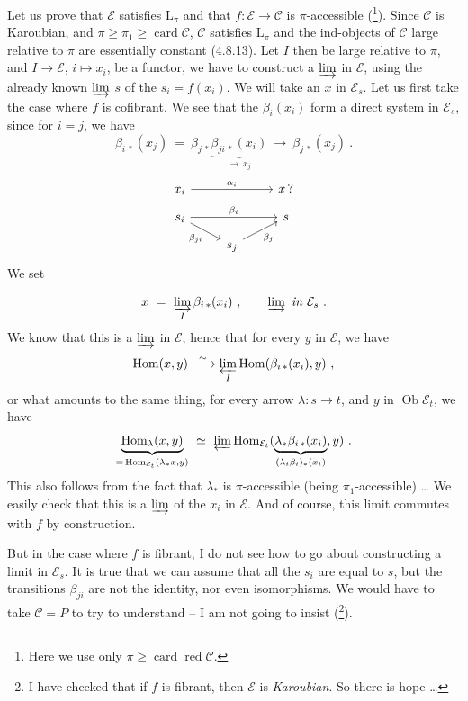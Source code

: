 \documentclass[11pt]{article}
\newcommand{\printedpage}[1]{\marginpar{\footnotesize p.~#1}}
\newcommand{\msp}[1]{\marginpar{\footnotesize [#1]}}
\newcommand{\cE}{\mathcal{E}}
\newcommand{\cC}{\mathcal{C}}
\newcommand{\Ob}{\operatorname{Ob}}
\newcommand{\Hom}{\operatorname{Hom}}
\newcommand{\card}{\operatorname{card}}
\newcommand{\red}{\operatorname{\text{red}}}
\begin{document}
Let us prove that $\cE$ satisfies $\mathrm{L}_{\pi}$ and that $f : \cE \longrightarrow \cC$ is $\pi$-accessible (\footnote[182]{Here we use only $\pi \geqslant \card \red \cC$.}). Since $\cC$ is Karoubian, and $\pi \geqslant \pi_1 \geqslant \card \cC$, $\cC$ satisfies $\mathrm{L}_{\pi}$ and the ind-objects of $\cC$ large relative to $\pi$ are essentially constant (4.8.13). Let $I$ then be large relative to $\pi$, and $I \longrightarrow \cE$, $i \longmapsto x_i$, be a functor, we have to construct a $\varinjlim$ in $\cE$, using the already known $\varinjlim$ $s$ of the $s_i = f(x_i)$. We will take an $x$ in $\cE_s$. Let us first take the case where $f$ is cofibrant. We see that the $\beta_i(x_i)$ form a direct system in $\cE_s$, since for $i = j$, we have
\[
\beta_{i\,*}(x_j) \ = \ \beta_{j\,*} \underbrace{\beta_{ji\,*}(x_i)}_{\longrightarrow \, x_j} \ \longrightarrow \ \beta_{j\,*}(x_j) \ . %
\]
\[
\begin{tikzcd}[row sep=small]
x_i \arrow[rr, "\alpha_i"] & & x \, ? \\
s_i \arrow[rr, "\beta_i"] \arrow[dr, "\beta_{ji}"'] & & s \\
& s_j \arrow[ur, "\beta_j"'] &
\end{tikzcd}
\]
We set

\printedpage{168}
\msp{page 438}
\[
x \ = \ \varinjlim_{I} \beta_{i\,*}(x_i) \ , \qquad \varinjlim \ \textit{in } \cE_s \ .
\]
We know that this is a $\varinjlim$ in $\cE$, hence that for every $y$ in $\cE$, we have
\[
\Hom(x, y) \xrightarrow{\ \sim\ } \varprojlim_{I} \Hom(\beta_{i\,*}(x_i), y) \ ,
\]
or what amounts to the same thing, for every arrow $\lambda : s \longrightarrow t$, and $y$ in $\Ob \cE_t$, we have
\[
\underbrace{\Hom_{\lambda}(x, y)}_{= \, \Hom_{\cE_t}(\lambda_* x, y)} \ \simeq \ \varprojlim \Hom_{\cE_t}(\underbrace{\lambda_* \beta_{i\,*}(x_i)}_{(\lambda_i \beta_i)_*(x_i)}, y) \ .
\]
This also follows from the fact that $\lambda_*$ is $\pi$-accessible (being $\pi_1$-accessible) \dots{} We easily check that this is a $\varinjlim$ of the $x_i$ in $\cE$. And of course, this limit commutes with $f$ by construction.

But in the case where $f$ is fibrant, I do not see how to go about constructing a limit in $\cE_s$. It is true that we can assume that all the $s_i$ are equal to $s$, but the transitions $\beta_{ji}$ are not the identity, nor even isomorphisms. We would have to take $\cC = P$ to try to understand -- I am not going to insist (\footnote[183]{I have checked that if $f$ is fibrant, then $\cE$ is \textit{Karoubian}. So there is hope \dots}).
\end{document}
